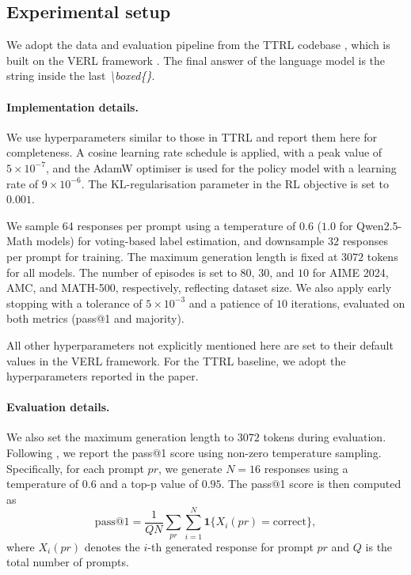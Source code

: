 \subsection{Experimental setup}
We adopt the data and evaluation pipeline from the TTRL codebase \citep{zuo2025ttrl}, which is built on the VERL framework \citep{sheng2024hybridflow}.
The final answer of the language model is the string inside the last \emph{\textbackslash boxed\{\}}.

\paragraph{Implementation details.} 
We use hyperparameters similar to those in TTRL \citep{zuo2025ttrl} and report them here for completeness. 
A cosine learning rate schedule is applied, with a peak value of $5 \times 10^{-7}$, and the AdamW optimiser is used for the policy model with a learning rate of $9 \times 10^{-6}$. 
The KL-regularisation parameter in the RL objective is set to $0.001$.

We sample 64 responses per prompt using a temperature of $0.6$ ($1.0$ for Qwen2.5-Math models) for voting-based label estimation, and downsample $32$ responses per prompt for training. The maximum generation length is fixed at $3072$ tokens for all models. The number of episodes is set to $80$, $30$, and $10$ for AIME 2024, AMC, and MATH-500, respectively, reflecting dataset size. We also apply early stopping with a tolerance of $5\times 10^{-3}$ and a patience of $10$ iterations, evaluated on both metrics (pass@1 and majority).

All other hyperparameters not explicitly mentioned here are set to their default values in the VERL framework.
For the TTRL \citep{zuo2025ttrl} baseline, we adopt the hyperparameters reported in the paper.


\paragraph{Evaluation details.}
We also set the maximum generation length to $3072$ tokens during evaluation.
Following \citet{zuo2025ttrl}, we report the pass@1 score using non-zero temperature
sampling. Specifically, for each prompt $pr$, we generate $N=16$ responses using a
temperature of $0.6$ and a top-p value of $0.95$. 
The pass@1 score is then computed as
$$
\text{pass@1}= \frac{1}{QN}\sum_{pr}\sum_{i=1}^N \mathbf{1}\{X_i(pr)=\text{correct}\},
$$
where $X_i(pr)$ denotes the $i$-th generated response for prompt $pr$ and $Q$ is the total number of prompts.

